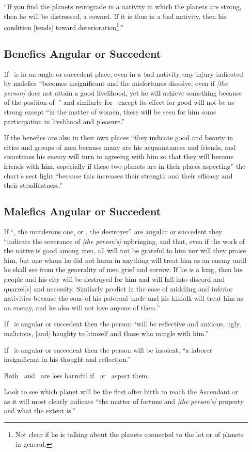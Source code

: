 ``If  you find the planets retrograde in a nativity in which the planets are strong, then he will be distressed, a coward. If it is thus in a bad nativity, then his condition [tends] toward deterioration\footnote{Not clear if he is talking about the planets connected to the lot or of planets in general.}.''

\subsection{Benefics Angular or Succedent}
If \Jupiter\, is in an angle or succedent place, even in a bad nativity, any injury indicated by malefics ``becomes insignificant and the misfortunes dissolve; even if \textsl{[the person]} does not attain a good livelihood, yet he will achieve something because of the position of \Jupiter\,'' and similarly for \Venus\, except its effect for good will not be as strong except ``in the matter of women, there will be seen for him some participation in livelihood and pleasure.''

If the benefics are also in their own places ``they indicate good and beauty in cities and groups of men because many are his acquaintances and friends, and sometimes his enemy will turn to agreeing with him so that they will become friends with him, especially \mndl if these two planets are in their places aspecting'' the chart's sect light ``because this increases their strength and their efficacy and their steadfastness.''

\subsection{Malefics Angular or Succedent}
If ``\Mars, the murderous one, or \Saturn, the destroyer'' are angular or succedent they ``indicate the severance of \textsl{[the person's]} upbringing, and that, even if the work of the native is good among men, all will not be grateful to him nor will they praise him, but one whom he did not harm in anything will treat him as an enemy until he shall see from the generality of men grief and sorrow. If he is a king, then his people and his city will be destroyed for him and will fall into discord and quarrel[s] and necessity. Similarly predict in the case of middling and inferior nativities because the sons of his paternal uncle and his kinfolk will treat him as an enemy, and he also will not love anyone of them.''

If \Saturn\, is angular or succedent then the person ``will be reflective and anxious, ugly, malicious, [and] haughty to himself and those who mingle with him.''

If \Mars\, is angular or succedent then the person will be insolent, ``a laborer insignificant in his thought and reflection.''

Both \Saturn\, and \Mars\, are less harmful if \Jupiter\, or \Venus\,  aspect them.

Look to see which planet will be the first after birth to reach the Ascendant or \Moon\, as it will most clearly indicate ``the matter of fortune and \textsl{[the person's]} property and what the extent is.''
